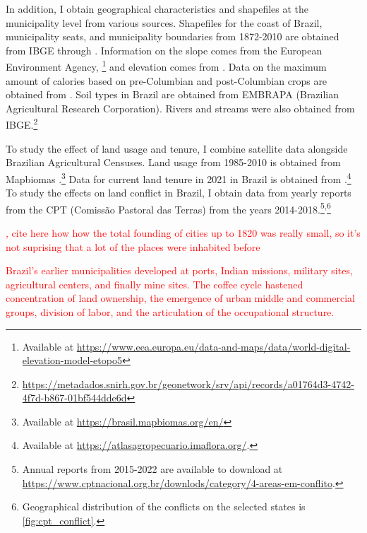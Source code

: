 \documentclass[11pt]{article}
\newcommand{\red}[1]{\textcolor{red}{#1}}
\begin{document}
In addition, I obtain geographical characteristics and shapefiles at the municipality level from various sources. 
Shapefiles for the coast of Brazil, municipality seats, and municipality boundaries from 1872-2010 are obtained from IBGE through \textcite{Pereira2023-qq}. %
Information on the slope comes from the European Environment Agency,
\footnote{
  Available at \url{https://www.eea.europa.eu/data-and-maps/data/world-digital-elevation-model-etopo5}} and elevation comes from \textcite{Amatulli2018-gl}.
Data on the maximum amount of calories based on pre-Columbian and post-Columbian crops are obtained from \textcite{Galor2016-ba}. 
Soil types in Brazil are obtained from EMBRAPA (Brazilian Agricultural Research Corporation).
Rivers and streams were also obtained from IBGE.\footnote{\url{https://metadados.snirh.gov.br/geonetwork/srv/api/records/a01764d3-4742-4f7d-b867-01bf544dde6d}}

To study the effect of land usage and tenure, I combine satellite data alongside Brazilian Agricultural Censuses. 
Land usage from 1985-2010 is obtained from Mapbiomas \parencite{Souza2020-kb}.\footnote{
  Available at \url{https://brasil.mapbiomas.org/en/}}
Data for current land tenure in 2021 in Brazil is obtained from \textcite{Sparovek2019-dn}.\footnote{
  Available at \url{https://atlasagropecuario.imaflora.org/}.}
To study the effects on land conflict in Brazil, I obtain data from yearly reports from the CPT (Comissão Pastoral das Terras) from the years 2014-2018.\footnote{Annual reports from 2015-2022 are available to download at \url{https://www.cptnacional.org.br/downlods/category/4-areas-em-conflito}.}\textsuperscript{,}\footnote{Geographical distribution of the conflicts on the selected states is \autoref{fig:cpt_conflict}.}

\red{\textcite{Morse1974-ml}, cite here how how the total founding of cities up to 1820 was really small, so it's not suprising that a lot of the places were inhabited before}

\red{Brazil’s  earlier  municipalities  developed  at  ports,  Indian missions,  military  sites,  agricultural  centers, and finally mine sites.
The coffee cycle hastened concentration of land ownership, the 
emergence of urban middle and commercial 
groups, division of labor,  and the  articulation  of the  occupational structure.}
\end{document}
